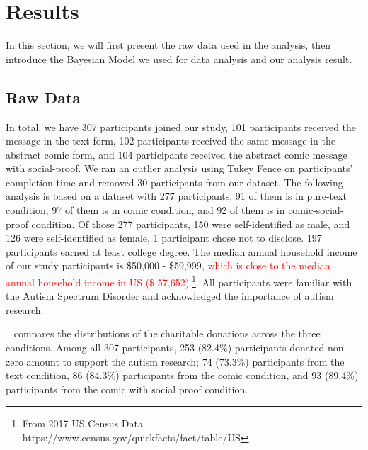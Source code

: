 \section{Results}
\label{sec:Study on Behavior Results}

In this section, we will first present the raw data used in the analysis, then introduce the Bayesian Model we used for data analysis and our analysis result.

\subsection{Raw Data}
\label{sub:Study on Behavior Raw Data}
In total, we have 307 participants joined our study, 101 participants received the message in the text form, 102 participants received the same message in the abstract comic form, and 104 participants received the abstract comic message with social-proof. We ran an outlier analysis using Tukey Fence on participants' completion time and removed 30 participants from our dataset. The following analysis is based on a dataset with 277 participants, 91 of them is in pure-text condition, 97 of them is in comic condition, and 92 of them is in comic-social-proof condition. Of those 277 participants, 150 were self-identified as male, and 126 were self-identified as female, 1 participant chose not to disclose. 197 participants earned at least college degree. The median annual household income of our study participants is \$50,000 - \$59,999, \textcolor{red}{which is close to the median annual household income in US (\$ 57,652).\footnote{From 2017 US Census Data https://www.census.gov/quickfacts/fact/table/US}.}  All participants were familiar with the Autism Spectrum Disorder and acknowledged the importance of autism research. 

~ compares the distributions of the charitable donations across the three conditions. Among all 307 participants, 253 (82.4\%) participants donated non-zero amount to support the autism research; 74 (73.3\%) participants from the text condition, 86 (84.3\%) participants from the comic condition, and 93 (89.4\%) participants from the comic with social proof condition.


